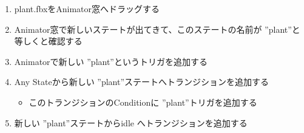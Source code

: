 \documentclass[a4paper]{report}
\newcommand{\fbxname}{{\ttfamily plant.fbx}}
\newcommand{\name}{ {\ttfamily ''plant''}}
\begin{document}
\begin{enumerate}
\begin{enumerate}
		\item \fbxname をAnimator窓へドラッグする
		\item Animator窓で新しいステートが出てきて、このステートの名前が\name と等しくと確認する
		\item Animatorで新しい\name というトリガを追加する
		\item Any Stateから新しい \name ステートへトランジションを追加する
			\begin{itemize}
				\item このトランジションのConditionに\name トリガを追加する
			\end{itemize}
		\item 新しい \name ステートからidle へトランジションを追加する
	\end{enumerate}
\end{enumerate}
\end{document}
